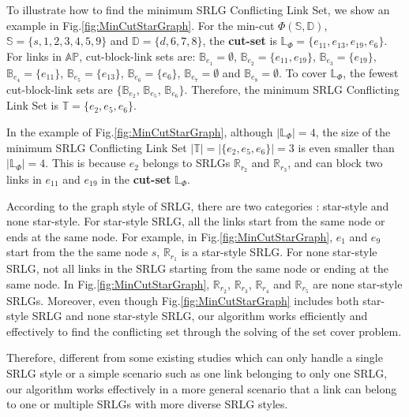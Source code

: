 To illustrate how to find the minimum SRLG Conflicting Link Set, we show an example in Fig.\ref{fig:MinCutStarGraph}. For the min-cut $\Phi(\mathbb{S},\mathbb{D})$, $\mathbb{S}=\{s, 1, 2, 3, 4, 5, 9\}$ and $\mathbb{D}=\{d, 6, 7, 8\}$, the \textbf{cut-set} is $\mathbb{L}_{\Phi}=\{e_{11},e_{13},e_{19},e_{6}\}$. For links in $\mathbb{AP}$,  cut-block-link sets are: $\mathbb{B}_{e_1}=\emptyset$, $\mathbb{B}_{e_2}=\{e_{11},e_{19}\}$, $\mathbb{B}_{e_3}=\{e_{19}\}$, $\mathbb{B}_{e_4}=\{e_{11}\}$, $\mathbb{B}_{e_5}=\{e_{13}\}$, $\mathbb{B}_{e_6}=\{e_6\}$, $\mathbb{B}_{e_7}=\emptyset$ and $\mathbb{B}_{e_8}=\emptyset$. To cover $\mathbb{L}_{\Phi}$, the fewest cut-block-link sets are $\{\mathbb{B}_{e_2}$, $\mathbb{B}_{e_5}$, $\mathbb{B}_{e_6}\}$. Therefore, the minimum SRLG Conflicting Link Set is $\mathbb{T}=\{e_2, e_5, e_6 \}$.

In the example of Fig.\ref{fig:MinCutStarGraph}, although $|\mathbb{L}_{\Phi}|=4$, the size of  the minimum SRLG Conflicting Link Set $|\mathbb{T}|=|\{e_2, e_5, e_6 \}|=3$ is even smaller than $|\mathbb{L}_{\Phi}|=4$. This is because $e_2$ belongs to   SRLGs $\mathbb{R}_{r_2}$ and $\mathbb{R}_{r_3}$, and can block two links in $e_{11}$ and  $e_{19}$ in the \textbf{cut-set} $\mathbb{L}_{\Phi}$.

According to the graph style of SRLG, there are two categories \cite{datta2008graph}:  star-style and none star-style. For star-style SRLG, all the links start from the same node or ends at the same node. For example, in Fig.\ref{fig:MinCutStarGraph}, $e_1$ and $e_9$ start from the  the same node $s$, $\mathbb{R}_{r_1}$ is a star-style SRLG.  For none star-style SRLG, not all links in the SRLG starting from the same node or ending at the same node. In Fig.\ref{fig:MinCutStarGraph}, $\mathbb{R}_{r_2}$, $\mathbb{R}_{r_3}$, $\mathbb{R}_{r_4}$ and $\mathbb{R}_{r_5}$ are none star-style SRLGs.
Moreover, even though Fig.\ref{fig:MinCutStarGraph} includes both  star-style SRLG  and none star-style SRLG,  our  algorithm works efficiently and effectively to find the conflicting set through the solving of the set cover problem.

Therefore, different from some existing studies \cite{datta2008graph} which can only handle a single SRLG style or a simple scenario such as  one link belonging to only one SRLG, our algorithm works effectively in a more  general scenario that a link can belong to one or multiple SRLGs with more diverse SRLG styles.



